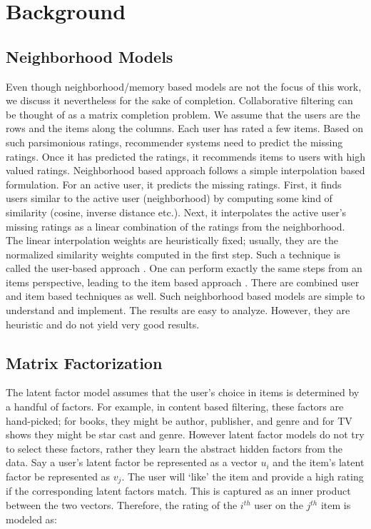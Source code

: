 \documentclass[conference]{IEEEtran}
\begin{document}
\section{Background}

\subsection{Neighborhood Models}
Even though neighborhood/memory based models are not the focus of this work, we discuss it nevertheless for the sake of completion.
Collaborative filtering can be thought of as a matrix completion problem. We assume that the users are the rows and the items along the columns. Each user has rated a few items. Based on such parsimonious ratings, recommender systems need to predict the missing ratings. Once it has predicted the ratings, it recommends items to users with high valued ratings.
Neighborhood based approach follows a simple interpolation based formulation. For an active user, it predicts the missing ratings. First, it finds users similar to the active user (neighborhood) by computing some kind of similarity (cosine, inverse distance etc.). Next, it interpolates the active user’s missing ratings as a linear combination of the ratings from the neighborhood. The linear interpolation weights are heuristically fixed; usually, they are the normalized similarity weights computed in the first step.
Such a technique is called the user-based approach \cite{Herlocker}. One can perform exactly the same steps from an items perspective, leading to the item based approach \cite{Sarwar}. There are combined user and item based techniques \cite{Wang} as well. Such neighborhood based models are simple to understand and implement. The results are easy to analyze. However, they are heuristic and do not yield very good results.

\subsection{Matrix Factorization}
The latent factor model assumes that the user’s choice in items is determined by a handful of factors. For example, in content based filtering, these factors are hand-picked; for books, they might be author, publisher, and genre and for TV shows they might be star cast and genre. However latent factor models do not try to select these factors, rather they learn the abstract hidden factors from the data. Say a user’s latent factor be represented as a vector $u_i$ and the item’s latent factor be represented as $v_j$. The user will ‘like’ the item and provide a high rating if the corresponding latent factors match. This is captured as an inner product between the two vectors. Therefore, the rating of the $i^{th}$ user on the $j^{th}$ item is modeled
as:
\end{document}
